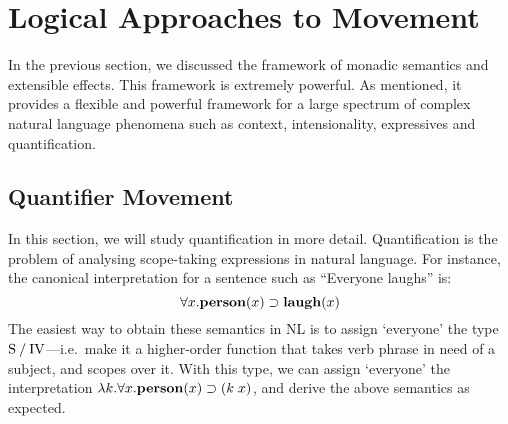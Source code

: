 \section{Logical Approaches to Movement}%
\label{sec:movement-and-quantifier-raising}

In the previous section, we discussed the framework of monadic
semantics and extensible effects. This framework is extremely
powerful. As mentioned, it provides a flexible and powerful framework
for a large spectrum of complex natural language phenomena such as
context, intensionality, expressives and quantification.

\subsection{Quantifier Movement}
In this section, we will study quantification in more detail.
Quantification is the problem of analysing scope-taking expressions in
natural language. For instance, the canonical interpretation for a
sentence such as ``Everyone laughs'' is:
\[
  \forall{x}.\mathbf{person}(x)\supset\mathbf{laugh}(x)
\]
The easiest way to obtain these semantics in NL is to assign
`everyone' the type $\text{S}\mathbin{\slash}\text{IV}$---i.e.\ make it a higher-order
function that takes verb phrase in need of a subject, and scopes over
it. With this type, we can assign `everyone' the interpretation
$\lambda{k}.\forall{x}.\mathbf{person}(x)\supset(k\;x)$, and derive the above
semantics as expected.

